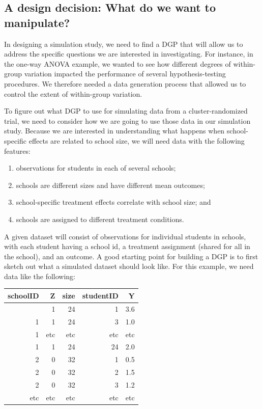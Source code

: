 \documentclass[
]{book}
\providecommand{\tightlist}{%
  \setlength{\itemsep}{0pt}\setlength{\parskip}{0pt}}
\begin{document}
\subsection{A design decision: What do we want to manipulate?}\label{a-design-decision-what-do-we-want-to-manipulate}

In designing a simulation study, we need to find a DGP that will allow us to address the specific questions we are interested in investigating.
For instance, in the one-way ANOVA example, we wanted to see how different degrees of within-group variation impacted the performance of several hypothesis-testing procedures.
We therefore needed a data generation process that allowed us to control the extent of within-group variation.

To figure out what DGP to use for simulating data from a cluster-randomized trial, we need to consider how we are going to use those data in our simulation study.
Because we are interested in understanding what happens when school-specific effects are related to school size, we will need data with the following features:

\begin{enumerate}
\def\labelenumi{\alph{enumi})}
\tightlist
\item
  observations for students in each of several schools;
\item
  schools are different sizes and have different mean outcomes;
\item
  school-specific treatment effects correlate with school size; and
\item
  schools are assigned to different treatment conditions.
\end{enumerate}

A given dataset will consist of observations for individual students in schools, with each student having a school id, a treatment assignment (shared for all in the school), and an outcome.
A good starting point for building a DGP is to first sketch out what a simulated dataset should look like.
For this example, we need data like the following:

\begin{longtable}[]{@{}rrrrr@{}}
\toprule\noalign{}
schoolID & Z & size & studentID & Y \\
\midrule\noalign{}
\endhead
\bottomrule\noalign{}
\endlastfoot
1 & 1 & 24 & 1 & 3.6 \\
1 & 1 & 24 & 3 & 1.0 \\
1 & etc & etc & etc & etc \\
1 & 1 & 24 & 24 & 2.0 \\
2 & 0 & 32 & 1 & 0.5 \\
2 & 0 & 32 & 2 & 1.5 \\
2 & 0 & 32 & 3 & 1.2 \\
etc & etc & etc & etc & etc \\
\end{longtable}
\end{document}
